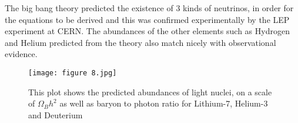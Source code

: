 The big bang theory predicted the existence of 3 kinds of neutrinos, in order for the equations to be derived and this was confirmed experimentally by the LEP experiment at CERN. The abundances of the other elements such as Hydrogen and Helium predicted from the theory also match nicely with observational evidence.

\begin{figure}[H]
    \centering
    \texttt{[image: figure 8.jpg]}
    \caption{This plot shows the predicted abundances of light nuclei, on a scale of $\Omega_{B}h^2$ as well as baryon to photon ratio for Lithium-7, Helium-3 and Deuterium}
    \label{fig:abundance}
\end{figure}